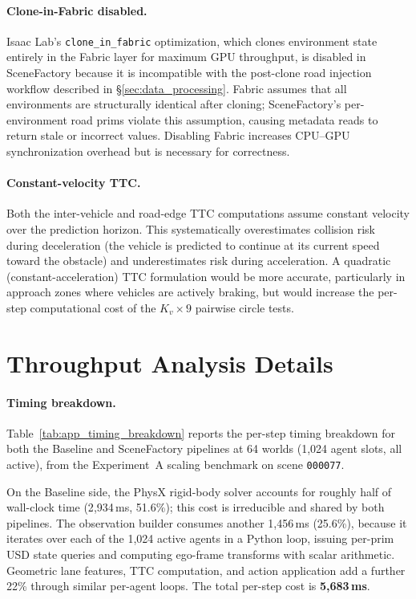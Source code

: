 \paragraph{Clone-in-Fabric disabled.}
Isaac Lab's \texttt{clone\_in\_fabric} optimization, which clones environment state entirely in the Fabric layer for maximum GPU throughput, is disabled in SceneFactory because it is incompatible with the post-clone road injection workflow described in \S\ref{sec:data_processing}.
Fabric assumes that all environments are structurally identical after cloning; SceneFactory's per-environment road prims violate this assumption, causing metadata reads to return stale or incorrect values.
Disabling Fabric increases CPU--GPU synchronization overhead but is necessary for correctness.

\paragraph{Constant-velocity TTC.}
Both the inter-vehicle and road-edge TTC computations assume constant velocity over the prediction horizon.
This systematically overestimates collision risk during deceleration (the vehicle is predicted to continue at its current speed toward the obstacle) and underestimates risk during acceleration.
A quadratic (constant-acceleration) TTC formulation would be more accurate, particularly in approach zones where vehicles are actively braking, but would increase the per-step computational cost of the $K_v{\times}9$ pairwise circle tests.


\section{Throughput Analysis Details}
\label{app:throughput}

\paragraph{Timing breakdown.}
Table~\ref{tab:app_timing_breakdown} reports the per-step timing breakdown for both the Baseline and SceneFactory pipelines at 64 worlds (1{,}024 agent slots, all active), from the Experiment~A scaling benchmark on scene \texttt{000077}.

On the Baseline side, the PhysX rigid-body solver accounts for roughly half of wall-clock time (2{,}934\,ms, 51.6\%); this cost is irreducible and shared by both pipelines.
The observation builder consumes another 1{,}456\,ms (25.6\%), because it iterates over each of the 1{,}024 active agents in a Python loop, issuing per-prim USD state queries and computing ego-frame transforms with scalar arithmetic.
Geometric lane features, TTC computation, and action application add a further 22\% through similar per-agent loops.
The total per-step cost is \textbf{5{,}683\,ms}.

